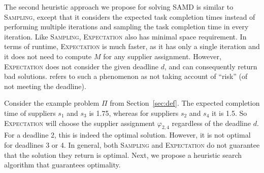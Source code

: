 \documentclass[letterpaper]{article} %
\newcommand{\samd}{\ac{SAMD}\xspace}
\newcommand{\sampling}{\textsc{Sampling}\xspace}
\newcommand{\expectation}{\textsc{Expectation}\xspace}
\begin{document}
The second heuristic approach we propose for solving \samd is 
similar to \sampling, except that it considers the expected task completion times instead of performing multiple iterations and sampling the task completion time in every iteration. 
Like \sampling, \expectation also has minimal space requirement. In terms of runtime, \expectation is much faster, as it has only a single iteration and it does not need to compute $M$ for any supplier assignment. However, \expectation does not consider the given deadline $d$, and can consequently return bad solutions. \citeauthor{loui1983optimal} refers to such a phenomenon as not taking account of ``risk'' (of not meeting the deadline).

Consider the example problem $\Pi$ from Section~\ref{sec:def}. The expected completion time of suppliers $s_1$ and $s_3$ is 1.75, whereas for suppliers $s_2$ and $s_4$ it is 1.5. So \expectation will choose the supplier assignment $\varphi_{2,4}$ regardless of the deadline $d$. For a deadline 2, this is indeed the optimal solution. However, it is not optimal for deadlines 3 or 4. In general, both \sampling and \expectation do not guarantee that the solution they return is optimal. Next, we propose a heuristic search algorithm that guarantees optimality. 







\end{document}
